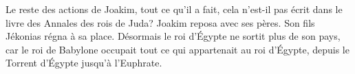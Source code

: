 Le reste des actions de Joakim, tout ce qu’il a fait,
	cela n’est-il pas écrit dans le livre des Annales des rois de Juda?
Joakim reposa avec ses pères. Son fils Jékonias régna à sa place.
Désormais le roi d’Égypte ne sortit plus de son pays,
	car le roi de Babylone occupait tout ce qui appartenait au roi d’Égypte,
	depuis le Torrent d’Égypte jusqu’à l’Euphrate.
